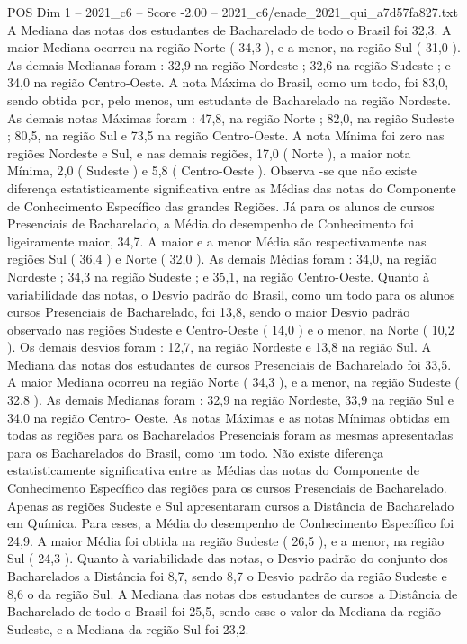 \begin{textsample}{POS Dim 1 – 2021\_c6 – Score -2.00 – 2021\_c6/enade\_2021\_qui\_a7d57fa827.txt}
A Mediana das notas dos estudantes de Bacharelado de todo o Brasil foi 32,3.
A maior Mediana ocorreu na região Norte ( 34,3 ), e a menor, na região Sul ( 31,0 ).
As demais Medianas foram : 32,9 na região Nordeste ; 32,6 na região Sudeste ; e 34,0 na região Centro-Oeste.
A nota Máxima do Brasil, como um todo, foi 83,0, sendo obtida por, pelo menos, um estudante de Bacharelado na região Nordeste.
As demais notas Máximas foram : 47,8, na região Norte ; 82,0, na região Sudeste ; 80,5, na região Sul e 73,5 na região Centro-Oeste.
A nota Mínima foi zero nas regiões Nordeste e Sul, e nas demais regiões, 17,0 ( Norte ), a maior nota Mínima, 2,0 ( Sudeste ) e 5,8 ( Centro-Oeste ).
Observa -se que não existe diferença estatisticamente significativa entre as Médias das notas do Componente de Conhecimento Específico das grandes Regiões.
Já para os alunos de cursos Presenciais de Bacharelado, a Média do desempenho de Conhecimento foi ligeiramente maior, 34,7.
A maior e a menor Média são respectivamente nas regiões Sul ( 36,4 ) e Norte ( 32,0 ).
As demais Médias foram : 34,0, na região Nordeste ; 34,3 na região Sudeste ; e 35,1, na região Centro-Oeste.
Quanto à variabilidade das notas, o Desvio padrão do Brasil, como um todo para os alunos cursos Presenciais de Bacharelado, foi 13,8, sendo o maior Desvio padrão observado nas regiões Sudeste e Centro-Oeste ( 14,0 ) e o menor, na Norte ( 10,2 ).
Os demais desvios foram : 12,7, na região Nordeste e 13,8 na região Sul.
A Mediana das notas dos estudantes de cursos Presenciais de Bacharelado foi 33,5.
A maior Mediana ocorreu na região Norte ( 34,3 ), e a menor, na região Sudeste ( 32,8 ).
As demais Medianas foram : 32,9 na região Nordeste, 33,9 na região Sul e 34,0 na região Centro- Oeste.
As notas Máximas e as notas Mínimas obtidas em todas as regiões para os Bacharelados Presenciais foram as mesmas apresentadas para os Bacharelados do Brasil, como um todo.
Não existe diferença estatisticamente significativa entre as Médias das notas do Componente de Conhecimento Específico das regiões para os cursos Presenciais de Bacharelado.
Apenas as regiões Sudeste e Sul apresentaram cursos a Distância de Bacharelado em Química.
Para esses, a Média do desempenho de Conhecimento Específico foi 24,9.
A maior Média foi obtida na região Sudeste ( 26,5 ), e a menor, na região Sul ( 24,3 ).
Quanto à variabilidade das notas, o Desvio padrão do conjunto dos Bacharelados a Distância foi 8,7, sendo 8,7 o Desvio padrão da região Sudeste e 8,6 o da região Sul.
A Mediana das notas dos estudantes de cursos a Distância de Bacharelado de todo o Brasil foi 25,5, sendo esse o valor da Mediana da região Sudeste, e a Mediana da região Sul foi 23,2.

\end{textsample}
